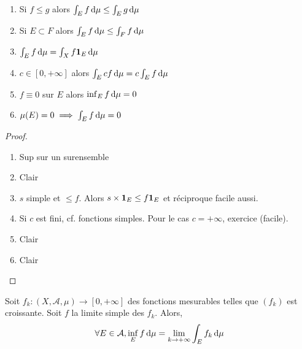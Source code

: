 \begin{prop}
\begin{enumerate}
    \item Si $f\leq g$ alors $\int_E f\mathop{}\!\mathrm d \mu\leq \int_Eg\mathop{}\!\mathrm d \mu$
    \item Si $E\subset F$ alors  $\int_E f\mathop{}\!\mathrm d \mu \leq  \int_Ff\mathop{}\!\mathrm d\mu$
    \item $\int_Ef\mathop{}\!\mathrm d \mu=\int_Xf\bm{1}_E\mathop{}\!\mathrm d \mu$
    \item  $c \in  [0, +\infty]$ alors $\int_Ecf\mathop{}\!\mathrm d\mu=c\int_Ef\mathop{}\!\mathrm d\mu$
    \item  $f\equiv 0$ sur  $E$ alors  $\inf_Ef\mathop{}\!\mathrm d \mu=0$
    \item  $\mu(E)=0 \implies \int_Ef\mathop{}\!\mathrm d \mu=0$
\end{enumerate}
\end{prop}

\begin{proof}
\begin{enumerate}
    \item Sup sur un surensemble
    \item Clair
    \item $s$ simple et  $\leq f$. Alors $s\times \bm{1}_E\leq f\bm{1}_E$ et réciproque facile aussi.
    \item Si $c$ est fini, cf. fonctions simples. Pour le cas  $c=+\infty$, exercice (facile). 
    \item Clair
    \item Clair
\end{enumerate}
\end{proof}

\begin{thm}
    Soit $f_k:(X, \mathcal  A, \mu)\longrightarrow [0, +\infty]$ des fonctions mesurables telles que $(f_k)$ est croissante. Soit  $f$ la limite simple des  $f_k$. Alors,  \[
        \forall  E \in  \mathcal  A, \inf_Ef\mathop{}\!\mathrm d \mu=\lim_{k\to +\infty}\int_Ef_k\mathop{}\!\mathrm d \mu
    \] 

\end{thm}

